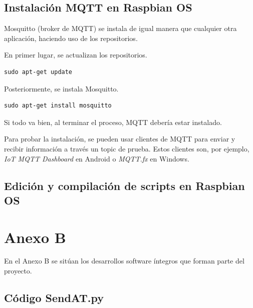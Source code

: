 \section{Instalación MQTT en Raspbian OS}\label{anexo:mqtt}

Mosquitto (broker de MQTT) se instala de igual manera que cualquier otra aplicación, haciendo uso de los repositorios.

En primer lugar, se actualizan los repositorios.

\begin{lstlisting}[frame=single, label=command:installmqtt1]
sudo apt-get update
\end{lstlisting}

Posteriormente, se instala Mosquitto.

\begin{lstlisting}[frame=single, label=command:installmqtt2]
sudo apt-get install mosquitto
\end{lstlisting}

Si todo va bien, al terminar el proceso, MQTT debería estar instalado.

Para probar la instalación, se pueden usar clientes de MQTT para enviar y recibir información a través un topic de prueba. Estos clientes son, por ejemplo, \textit{IoT MQTT Dashboard} en Android o \textit{MQTT.fx} en Windows.

\section{Edición y compilación de scripts en Raspbian OS}\label{anexo:scripts}



\chapter{Anexo B}

En el Anexo B se sitúan los desarrollos software íntegros que forman parte del proyecto.

\lstset{numbers=left,numberstyle=\tiny, language=Python, breaklines=true, basicstyle=\footnotesize, xleftmargin=25pt, framesep=8pt, numbersep=15pt}

\section{Código SendAT.py}

